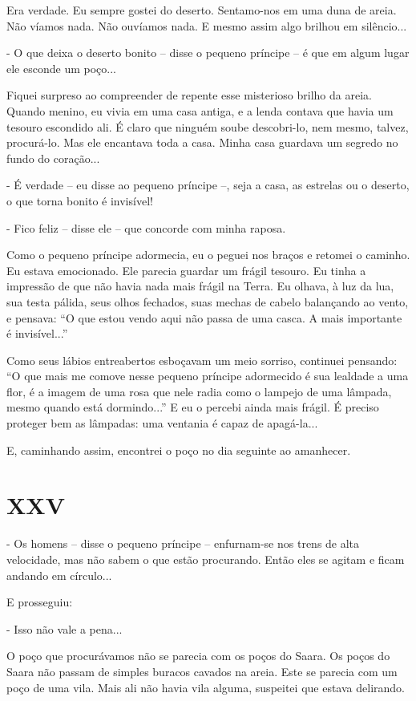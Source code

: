 Era verdade. Eu sempre gostei do deserto. Sentamo-nos em uma duna de
areia. Não víamos nada. Não ouvíamos nada. E mesmo assim algo brilhou em
silêncio...

- O que deixa o deserto bonito -- disse o pequeno príncipe -- é que em
algum lugar ele esconde um poço...

Fiquei surpreso ao compreender de repente esse misterioso brilho da
areia. Quando menino, eu vivia em uma casa antiga, e a lenda contava que
havia um tesouro escondido ali. É claro que ninguém soube descobri-lo,
nem mesmo, talvez, procurá-lo. Mas ele encantava toda a casa. Minha casa
guardava um segredo no fundo do coração...

- É verdade -- eu disse ao pequeno príncipe --, seja a casa, as estrelas
ou o deserto, o que torna bonito é invisível!

- Fico feliz -- disse ele -- que concorde com minha raposa.

Como o pequeno príncipe adormecia, eu o peguei nos braços e retomei o
caminho. Eu estava emocionado. Ele parecia guardar um frágil tesouro. Eu
tinha a impressão de que não havia nada mais frágil na Terra. Eu olhava,
à luz da lua, sua testa pálida, seus olhos fechados, suas mechas de
cabelo balançando ao vento, e pensava: ``O que estou vendo aqui não
passa de uma casca. A mais importante é invisível...''

Como seus lábios entreabertos esboçavam um meio sorriso, continuei
pensando: ``O que mais me comove nesse pequeno príncipe adormecido é sua
lealdade a uma flor, é a imagem de uma rosa que nele radia como o
lampejo de uma lâmpada, mesmo quando está dormindo...'' E eu o percebi
ainda mais frágil. É preciso proteger bem as lâmpadas: uma ventania é
capaz de apagá-la...

E, caminhando assim, encontrei o poço no dia seguinte ao amanhecer.

\chapter{XXV}

- Os homens -- disse o pequeno príncipe -- enfurnam-se nos trens de alta
velocidade, mas não sabem o que estão procurando. Então eles se agitam e
ficam andando em círculo...

E prosseguiu:

- Isso não vale a pena...

O poço que procurávamos não se parecia com os poços do Saara. Os poços
do Saara não passam de simples buracos cavados na areia. Este se parecia
com um poço de uma vila. Mais ali não havia vila alguma, suspeitei que
estava delirando.

